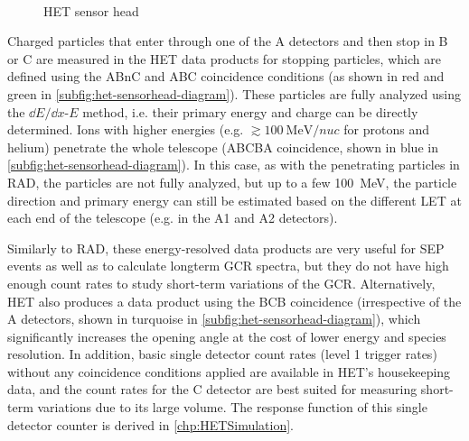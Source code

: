 \begin{figure}
	\centering
	\\
	\caption[\acs{HET} sensor head]{\acs{HET} sensor head}
	\label{fig:het-sensorhead}
\end{figure}

Charged particles that enter through one of the A detectors and then stop in B or C are measured in the \ac{HET} data products for stopping particles, which are defined using the ABnC and ABC coincidence conditions (as shown in red and green in \autoref{subfig:het-sensorhead-diagram}). These particles are fully analyzed using the $\dd E/\dd x$-$E$ method, i.e. their primary energy and charge can be directly determined.
Ions with higher energies (e.g. $\gtrsim\SI{100}{\mega\electronvolt\per nuc}$ for protons and helium) penetrate the whole telescope (ABCBA coincidence, shown in blue in \autoref{subfig:het-sensorhead-diagram}). In this case, as with the penetrating particles in \ac{RAD}, the particles are not fully analyzed, but up to a few \SI{100}{\mega\electronvolt}, the particle direction and primary energy can still be estimated based on the different \ac{LET} at each end of the telescope (e.g. in the A1 and A2 detectors).

Similarly to \ac{RAD}, these energy-resolved data products are very useful for \ac{SEP} events as well as to calculate longterm \ac{GCR} spectra, but they do not have high enough count rates to study short-term variations of the \ac{GCR}. Alternatively, \ac{HET} also produces a data product using the BCB coincidence (irrespective of the A detectors, shown in turquoise in \autoref{subfig:het-sensorhead-diagram}), which significantly increases the opening angle at the cost of lower energy and species resolution. In addition, basic single detector count rates (level 1 trigger rates) without any coincidence conditions applied are available in \ac{HET}'s housekeeping data, and the count rates for the C detector are best suited for measuring short-term variations due to its large volume. The response function of this single detector counter is derived in \autoref{chp:HETSimulation}.

